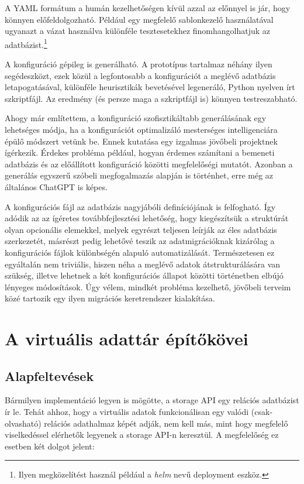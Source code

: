 \documentclass[
    parspace,
    noindent,
    nohyp,
]{elteiktdk}[2023/04/10]
\begin{document}
A YAML formátum a humán kezelhetőségen kívül azzal az előnnyel is jár, hogy könnyen előfeldolgozható.
Például egy megfelelő sablonkezelő használatával ugyanazt a vázat használva
különféle tesztesetekhez finomhangolhatjuk az adatbázist.\footnote{
    Ilyen megközelítést használ például a \textit{helm} nevű deployment eszköz.
}

A konfiguráció gépileg is generálható.
A prototípus tartalmaz néhány ilyen segédeszközt,
ezek közül a legfontosabb a konfigurációt a meglévő adatbázis letapogatásával,
különféle heurisztikák bevetésével legeneráló, Python nyelven írt szkriptfájl.
Az eredmény (és persze maga a szkriptfájl is) könnyen testreszabható.

Ahogy már említettem, a konfiguráció szofisztikáltabb generálásának egy lehetséges módja,
ha a konfigurációt optimalizáló mesterséges intelligenciára épülő módszert vetünk be.
Ennek kutatása egy izgalmas jövőbeli projektnek ígérkezik.
Érdekes probléma például, hogyan érdemes számítani a bemeneti adatbázis
és az előállított konfiguráció közötti megfelelőségi mutatót.%
\cite{Erritali2016DocumentSimilarity}
Azonban a generálás egyszerű szóbeli megfogalmazás alapján is történhet,
erre még az általános ChatGPT is képes.

A konfigurációs fájl az adatbázis nagyjábóli definíciójának is felfogható.
Így adódik az az ígéretes továbbfejlesztési lehetőség,
hogy kiegészítsük a struktúrát olyan opcionális elemekkel,
melyek egyrészt teljesen leírják az éles adatbázis szerkezetét,
másrészt pedig lehetővé teszik az adatmigrációknak
kizárólag a konfigurációs fájlok különbségén alapuló automatizálását.
Természetesen ez egyáltalán nem triviális,
hiszen néha a meglévő adatok átstrukturálására van szükség,
illetve lehetnek a két konfigurációs állapot közötti történetben elbújó lényeges módosítások.
Úgy vélem, mindkét probléma kezelhető,
jövőbeli terveim közé tartozik egy ilyen migrációs keretrendszer kialakítása.



\chapter{A virtuális adattár építőkövei}

\section{Alapfeltevések}

Bármilyen implementáció legyen is mögötte, a storage API egy relációs adatbázist ír le.
Tehát ahhoz, hogy a virtuális adatok funkcionálisan egy valódi (csak-olvasható) relációs adathalmaz képét adják,
nem kell más, mint hogy megfelelő viselkedéssel elérhetők legyenek a storage API-n keresztül.
A megfelelőség ez esetben két dolgot jelent:
\end{document}
